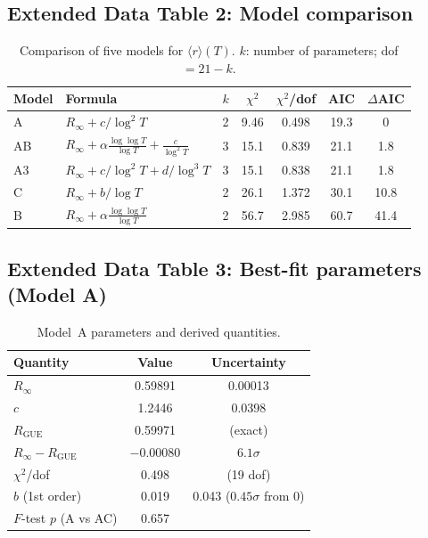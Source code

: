 \documentclass[10pt]{article}
\theoremstyle{remark}
\begin{document}
\subsection{Extended Data Table 2: Model comparison}

\begin{table}[H]
\centering
\caption{Comparison of five models for $\langle r\rangle(T)$.
$k$: number of parameters; dof $= 21 - k$.}
\label{tab:modelcomp}
\begin{tabular}{llccccc}
\toprule
Model & Formula & $k$ & $\chi^2$ & $\chi^2$/dof & AIC & $\Delta$AIC \\
\midrule
A  & $R_\infty + c/\log^2 T$ & 2 & 9.46 & 0.498 & 19.3 & 0 \\
AB & $R_\infty + \alpha\frac{\log\log T}{\log T} + \frac{c}{\log^2 T}$
   & 3 & 15.1 & 0.839 & 21.1 & 1.8 \\
A3 & $R_\infty + c/\log^2 T + d/\log^3 T$ & 3 & 15.1 & 0.838 & 21.1 & 1.8 \\
C  & $R_\infty + b/\log T$ & 2 & 26.1 & 1.372 & 30.1 & 10.8 \\
B  & $R_\infty + \alpha\frac{\log\log T}{\log T}$ & 2 & 56.7 & 2.985 & 60.7 & 41.4 \\
\bottomrule
\end{tabular}
\end{table}


\subsection{Extended Data Table 3: Best-fit parameters (Model A)}

\begin{table}[H]
\centering
\caption{Model~A parameters and derived quantities.}
\label{tab:params}
\begin{tabular}{lcc}
\toprule
Quantity & Value & Uncertainty \\
\midrule
$R_\infty$ & 0.59891 & 0.00013 \\
$c$ & 1.2446 & 0.0398 \\
$R_{\mathrm{GUE}}$ & 0.59971 & (exact) \\
$R_\infty - R_{\mathrm{GUE}}$ & $-0.00080$ & $6.1\sigma$ \\
$\chi^2$/dof & 0.498 & (19 dof) \\
$b$ (1st order) & 0.019 & 0.043 ($0.45\sigma$ from 0) \\
$F$-test $p$ (A vs AC) & 0.657 & \\
\bottomrule
\end{tabular}
\end{table}
\end{document}
